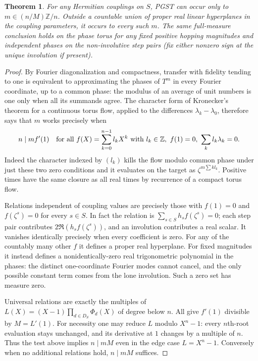 \documentclass[10pt]{article}
\newtheorem{theorem}{Theorem}
\newcommand{\ZZ}{\mathbb Z}\newcommand{\QQ}{\mathbb Q}
\begin{document}
\begin{theorem}\label{th:generic}
For any Hermitian couplings on $S$, PGST can occur only to
$m\in(n/M)\ZZ/n$. Outside a countable union of proper real linear
hyperplanes in the coupling parameters, it occurs to every such $m$.
The same full-measure conclusion holds on the phase torus for any fixed
positive hopping magnitudes and independent phases on the non-involutive
step pairs (fix either nonzero sign at the unique involution if present).
\end{theorem}
\begin{proof}
By Fourier diagonalization and compactness, transfer with fidelity tending
to one is equivalent to approximating the phases of $T^m$ in every
Fourier coordinate, up to a common phase: the modulus of an average of
unit numbers is one only when all its summands agree.
The character form of Kronecker's theorem for a continuous torus flow,
applied to the differences $\lambda_k-\lambda_0$, therefore says that $m$ works precisely when
\[
 n\mid m f'(1)\quad\hbox{for all }f(X)=\sum_{k=0}^{n-1} l_k X^k
 \text{ with }l_k\in\ZZ,\ f(1)=0,\ \sum_k l_k\lambda_k=0 .
\]
Indeed the character indexed by $(l_k)$ kills the flow modulo common phase under just these two zero conditions and it evaluates on the target as $\zeta^{m\sum k l_k}$.
Positive times have the same closure as all real times by recurrence of a compact torus flow.

Relations independent of coupling values are precisely those with
$f(1)=0$ and $f(\zeta^s)=0$ for every $s\in S$. In fact the relation is
$\sum_{s\in S}h_s f(\zeta^s)=0$; each step pair contributes
$2\Re(h_s f(\zeta^s))$, and an involution contributes a real scalar.
It vanishes identically precisely when every coefficient is zero. For any
of the countably many other $f$ it defines a proper real hyperplane.
For fixed magnitudes it instead defines a nonidentically-zero real trigonometric polynomial in the phases: the distinct one-coordinate Fourier modes cannot cancel, and the only possible constant term comes from the lone involution. Such a zero set has measure zero.

Universal relations are exactly the multiples of
$L(X)=(X-1)\prod_{d\in D_S}\Phi_d(X)$ of degree below $n$.
All give $f'(1)$ divisible by $M=L'(1)$. For necessity one may reduce
$L$ modulo $X^n-1$: every $n$th-root evaluation stays unchanged, and its derivative at $1$ changes by a multiple of $n$. Thus the test above implies $n\mid mM$ even in the edge case $L=X^n-1$. Conversely when no additional relations hold, $n\mid mM$ suffices.
\end{proof}
\end{document}
